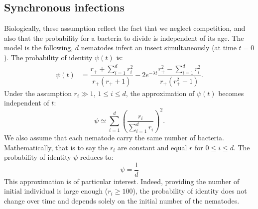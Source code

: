 \documentclass[10pt]{article}
\begin{document}
\begin{multicols}{2}
\subsection*{Synchronous infections}
Biologically, these assumption reflect the fact that we neglect competition, and also that the probability for a bacteria to divide is independent of its age.
The model is the following, $d$ nematodes infect an insect simultaneously (at time $t=0$). The probability of identity $\psi(t)$ is:
\begin{align}
\psi(t) &= \dfrac{ r_+ + \sum_{i=1}^d r_i^2}{r_+ (r_+ +1)}  -2 e^{-\lambda t} \dfrac{ r_+^2-\sum_{i=1}^d r_i^2}{r_+ (r_+^2 -1) }. \label{psi_simultaneous} 
\end{align}
Under the assumption $r_i \gg 1$, $ 1 \leq i \leq d $, the approximation of $\psi(t)$ becomes independent of $t$:
 \begin{equation}
\psi \simeq \displaystyle \sum_{i=1}^d \left( \dfrac{ r_i}{\sum_{i=1}^d r_i} \right)^2.
 \end{equation}
We also assume that each nematode carry the same number of bacteria. Mathematically, that is to say the $r_i$ are constant and equal $r$ for $0 \leq i \leq d$. The probability of identity $\psi$ reduces to:
\begin{equation}
\psi = \dfrac{1}{d}
\end{equation}
 This approximation is of particular interest. Indeed, providing the number of initial individual is large enough ($r_i \geq 100$), the probability of identity does not change over time and depends solely on the initial number of the nematodes. 

\end{multicols}
\end{document}
